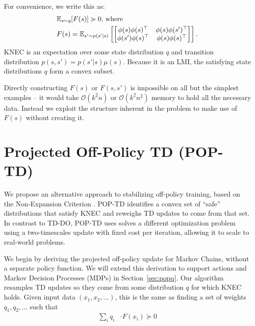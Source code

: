 For convenience, we write this as:
\begin{align}
   & \mathbb{E}_{s\sim q}  [F(s)] \succcurlyeq 0 \text{, where}                            \\
   & F(s) = \mathbb{E}_{s'\sim p(s'|s)}  \left[\begin{bmatrix}
                                           \phi(s)\phi(s)^\top  & \phi(s)\phi(s')^\top \\
                                           \phi(s')\phi(s)^\top & \phi(s)\phi(s)^\top
                                         \end{bmatrix}\right] . \label{eqn:fmatrix}
\end{align}
KNEC is an expectation over some state distribution $q$ and transition distribution $p(s,s') = p(s'|s) \mu(s)$. Because it is an LMI, the satisfying state distributions $q$ form a convex subset.

Directly constructing $F(s)$ or $F(s, s')$ is impossible on all but the simplest examples -- it would take $\mathcal O(k^2n)$ or $\mathcal O(k^2n^2)$ memory to hold all the necessary data. Instead we exploit the structure inherent in the problem to make use of $F(s)$ without creating it.



\section{Projected Off-Policy TD (POP-TD) }

We propose an alternative approach to stabilizing off-policy training, based on the Non-Expansion Criterion \citep{kolter2011fixed}. POP-TD identifies a convex set of ``safe'' distributions that satisfy KNEC and reweighs TD updates to come from that set. In contrast to TD-DO, POP-TD uses solves a different optimization problem using a two-timescales update with fixed cost per iteration, allowing it to scale to real-world problems.

We begin by deriving the projected off-policy update for Markov Chains, without a separate policy function. We will extend this derivation to support actions and Markov Decision Processes (MDPs) in Section~\ref{sec:popq}. Our algorithm resamples TD updates so they come from some distribution $q$ for which KNEC holds. Given input data $(x_1, x_2, \ldots)$, this is the same as finding a set of weights $q_1, q_2, \ldots$ such that
\begin{align}
  \sum_i q_i & \cdot F(x_i) \succcurlyeq 0
\end{align}


